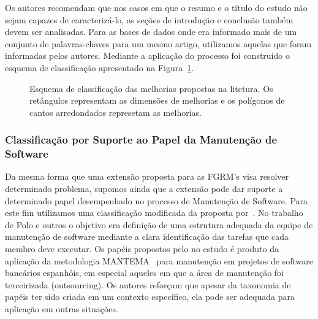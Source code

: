 Os autores recomendam que nos casos em que o resumo e o título do estudo não
sejam capazes de caracterizá-lo, as seções de introdução e conclusão também
devem ser analisadas. Para as bases de dados onde era informado mais de um
conjunto de palavras-chaves para um mesmo artigo, utilizamos aquelas que foram
informadas pelos autores. Mediante a aplicação do processo foi construído o
esquema de classificação apresentado na
Figura~\ref{fig:diagrama-esquema-dimensao-melhorias}.

\begin{figure}[tb]
\centering
\caption{Esquema de classificação das melhorias propostas na litetura. Os
	retângulos representam as dimensões de melhorias e os polígonos de cantos
	arredondados represetam as melhorias.}
\label{fig:diagrama-esquema-dimensao-melhorias}
\end{figure}


\subsubsection{Classificação por Suporte ao Papel da Manutenção de Software}
\label{subsubsec:map-esquema-suporte-papel-man}

Da mesma forma que uma extensão proposta para as FGRM's visa resolver
determinado problema, supomos ainda que a extensão pode dar suporte a
determinado papel desempenhado no processo de Manutenção de Software. Para este
fim utilizamos uma classificação modificada da proposta por~\cite{Polo1999}. No
trabalho de Polo e outros o objetivo era definição de uma estrutura adequada da
equipe de manutenção de software mediante a clara identificação das tarefas que
cada membro deve executar. Os papéis propostos pelo no estudo é produto da
aplicação da metodologia MANTEMA~\cite{756695} para manutenção em projetos de
software bancários espanhóis, em especial aqueles em que a área de manutenção
foi terceirizada (outsourcing). Os autores reforçam que apesar da taxonomia de
papéis ter sido criada em um contexto específico, ela pode ser adequada para
aplicação em outras situações.

